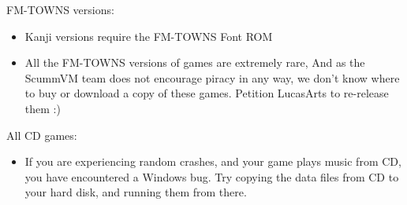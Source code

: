 FM-TOWNS versions:
  \begin{itemize}
  \item Kanji versions require the FM-TOWNS Font ROM
  \item All the FM-TOWNS versions of games are extremely rare,
                  And as the ScummVM team does not encourage piracy in any
                  way, we don't know where to buy or download a copy of these
                  games. Petition LucasArts to re-release them :)
  \end{itemize}
All CD games:
  \begin{itemize}
  \item If you are experiencing random crashes, and your game
                 plays music from CD, you have encountered a Windows bug.
                 Try copying the data files from CD to your hard disk, and
                 running them from there.
  \end{itemize}
